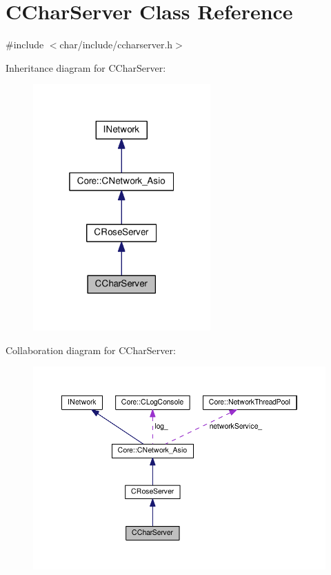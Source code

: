 \hypertarget{classCCharServer}{}\section{C\+Char\+Server Class Reference}
\label{classCCharServer}


{\ttfamily \#include $<$char/include/ccharserver.\+h$>$}



Inheritance diagram for C\+Char\+Server\+:
\nopagebreak
\begin{figure}[H]
\begin{center}
\leavevmode
\includegraphics[width=193pt]{classCCharServer__inherit__graph}
\end{center}
\end{figure}


Collaboration diagram for C\+Char\+Server\+:
\nopagebreak
\begin{figure}[H]
\begin{center}
\leavevmode
\includegraphics[width=350pt]{classCCharServer__coll__graph}
\end{center}
\end{figure}

